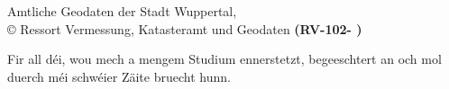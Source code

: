 


\newcommand{\incgraph}[2]{\IfFileExists{#2}{\texttt{[image: \#2]}}{\texttt{[image: ./img/dummy.png]}}}

\usepackage{rotating}
\addto{}
\usepackage{tabulary}
\usepackage{caption}
\usepackage{wrapfig}

\newcommand\blankpage{%
   \newpage
\thispagestyle{empty}
\mbox{}}

\newenvironment{dedica}
  {\clearpage           %
   \thispagestyle{empty}%
   \vspace*{\stretch{1}}%
   \itshape             %
   \raggedleft          %
  }
  {\par %
   \vspace{\stretch{3}} %
   \clearpage           %
  }






\blankpage

\blankpage

\newpage
\vspace*{\fill}
Amtliche Geodaten der Stadt Wuppertal, \\
© Ressort Vermessung, Katasteramt und Geodaten \textbf{(RV-102- )}
\newpage
\blankpage


\blankpage

\begin{dedica}
Fir all déi, wou mech a mengem Studium ennerstetzt, begeeschtert an och mol duerch méi schwéier Zäite bruecht hunn. 
\end{dedica}


\tableofcontents






\nocite{bezk-alkis}

\begingroup
\sloppy
\singlespacing
\printbibliography
\endgroup

\begingroup
\singlespacing

\endgroup

 

